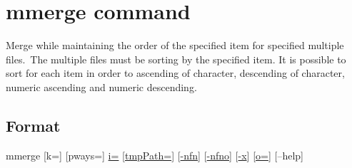 \documentclass[a4paper]{jarticle}
\begin{document}
\setlength{\baselineskip}{4mm}

\section*{mmerge command}
Merge while maintaining the order of the specified item for specified multiple files. The multiple files must be sorting by the specified item. It is possible to sort for each item in order to ascending of character, descending of character, numeric ascending and numeric descending.
\subsection*{Format}
mmerge 
[k=] [pways=] 
\href{run:option.pdf}{i=} 
[\href{run:option.pdf}{tmpPath=}] 
[\href{run:option.pdf}{-nfn}] 
[\href{run:option.pdf}{-nfno}] 
[\href{run:option.pdf}{-x}] 
[\href{run:option.pdf}{o=}] 
[--help]\\
\end{document}
